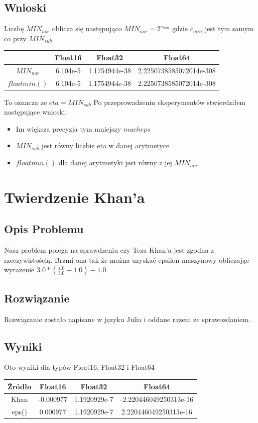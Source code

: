 \documentclass{article}
\begin{document}
\subsection{Wnioski}
        Liczbę $MIN_{nor}$ oblicza się następująco $MIN_{nor} = 2^{c_{min}}$ gdzie $c_{min}$ jest tym samym co przy $MIN_{sub}$ 
        \begin{center}
        \begin{tabular}{|c|c|c|c|}
        \hline
             & Float16 & Float32 & Float64 \\
            \hline
            $MIN_{nor}$ & 6.104e-5 & 1.1754944e-38 & 2.2250738585072014e-308\\
            \hline
            $floatmin()$ & 6.104e-5 & 1.1754944e-38 & 2.2250738585072014e-308\\
        \hline
        \end{tabular}
    \end{center}
    To oznacza ze $eta = MIN_{sub}$
    Po przeprowadzeniu eksperymentów stwierdziłem następujące wnioski:
    \begin{itemize}
        \item Im większa precyzja tym mniejszy $macheps$ 
        \item $MIN_{sub}$ jest równy liczbie eta w danej arytmetyce
        \item $floatmin()$ dla danej arytmetyki jest równy z jej $MIN_{nor}$
    \end{itemize}

\section{Twierdzenie Khan'a}
\subsection{Opis Problemu}
    Nasz problem polega na sprawdzeniu czy Teza Khan'a jest zgodna z rzeczywistością. Brzmi ona tak że można uzyskać epsilon maszynowy obliczając wyrażenie $3.0*(\frac{4.0}{3.0} - 1.0) - 1.0$
\subsection{Rozwiązanie}
    Rozwiązanie zostało napisane w języku Julia i oddane razem ze sprawozdaniem.
\subsection{Wyniki}
    Oto wyniki dla typów Float16, Float32 i Float64
    \begin{center}
        \begin{tabular}{|c||c|c|c|}
        \hline
            Źródło & Float16 & Float32 & Float64 \\
            \hline\hline
            Khan & -0.000977 & 1.1920929e-7 & -2.220446049250313e-16\\
             \hline
             eps() & 0.000977 & 1.1920929e-7 & 2.220446049250313e-16\\
        \hline
        \end{tabular}
    \end{center}
\end{document}

